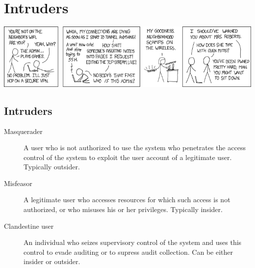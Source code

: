 \mode*




\section{Intruders}

\begin{frame}
  \includegraphics[width=\columnwidth]{figs/xkcd-341.png}
\end{frame}

\subsection{Intruders}

\begin{frame}
  \begin{description}
    \item[Masquerader] A user who is not authorized to use the system who 
      penetrates the access control of the system to exploit the user account 
      of a legitimate user.
      Typically outsider.

    \item[Misfeasor] A legitimate user who accesses resources for which such 
      access is not authorized, or who misuses his or her privileges.
      Typically insider.

    \item[Clandestine user] An individual who seizes supervisory control of the 
      system and uses this control to evade auditing or to supress audit 
      collection.
      Can be either insider or outsider.

  \end{description}
\end{frame}


